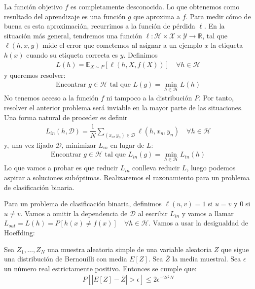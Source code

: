 La función objetivo $f$ es completamente desconocida. Lo que obtenemos como resultado del aprendizaje es una función $g$ que aproxima a $f$. Para medir cómo de buena es esta aproximación, recurrimos a la función de pérdida $\ell$.
En la situación más general, tendremos una función $\ell: \mathcal{H} \times \mathcal{X} \times \mathcal{Y} \to \mathbb{R}$, tal que $\ell(h, x, y)$ mide el error que cometemos al asignar a un ejemplo $x$ la etiqueta $h(x)$ cuando su etiqueta correcta es $y$. Definimos 
\begin{gather*}
	L(h) = \mathbb{E}_{X \sim P}[\ell(h, X, f(X))] \quad \forall h \in \mathcal{H}
\end{gather*}
y queremos resolver:
\begin{gather*}
	\text{Encontrar $g \in \mathcal{H}$ tal que } L(g) = \min_{h \in \mathcal{H}} L(h)
\end{gather*}
No tenemos acceso a la función $f$ ni tampoco a la distribución $P$. Por tanto, resolver el anterior problema será inviable en la mayor parte de las situaciones. Una forma natural de proceder es definir 
\begin{gather*}
	L_{in}(h, \mathcal{D}) =  \dfrac{1}{N}\sum_{(x_n, y_n) \in \mathcal{D}} \ell(h, x_n, y_n) \quad  \forall h \in \mathcal{H}
\end{gather*}
y, una vez fijado $\mathcal{D}$, minimizar $L_{in}$ en lugar de $L$:
\begin{gather*}
	\text{Encontrar $g \in \mathcal{H}$ tal que } L_{in}(g) = \min_{h \in \mathcal{H}} L_{in}(h)
\end{gather*}
Lo que vamos a probar es que reducir $L_{in}$ conlleva reducir $L$, luego podemos aspirar a soluciones subóptimas. Realizaremos el razonamiento para un problema de clasificación binaria.

Para un problema de clasificación binaria, definimos $\ell(u,v)=1$ si $u=v$ y $0$ si $u\neq v$. Vamos a omitir la dependencia de $\mathcal{D}$ al escribir $L_{in}$ y vamos a llamar $L_{out} = L(h) = P[h(x) \neq f(x)] \quad \forall h \in \mathcal{H}$. Vamos a usar la desigualdad de Hoeffding:

\begin{lemma}\label{hoeffding}
	Sea $Z_1, \ldots, Z_N$ una muestra aleatoria simple de una variable aleatoria $Z$ que sigue una distribución de Bernouilli con media $E[Z]$. Sea $\bar{Z}$ la media muestral. Sea $\epsilon$ un número real estrictamente positivo. Entonces se cumple que:
	\begin{align}
		P[ |E[Z] - \bar{Z}| > \epsilon  ] \leq 2 \epsilon^{-2 \epsilon^2 N}
	\end{align}
\end{lemma}

